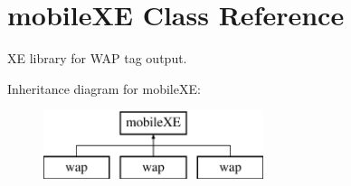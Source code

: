 \hypertarget{classmobileXE}{\section{mobile\+X\+E Class Reference}
\label{classmobileXE}
}


X\+E library for W\+A\+P tag output.  


Inheritance diagram for mobile\+X\+E\+:\begin{figure}[H]
\begin{center}
\leavevmode
\includegraphics[height=2.000000cm]{classmobileXE}
\end{center}
\end{figure}
